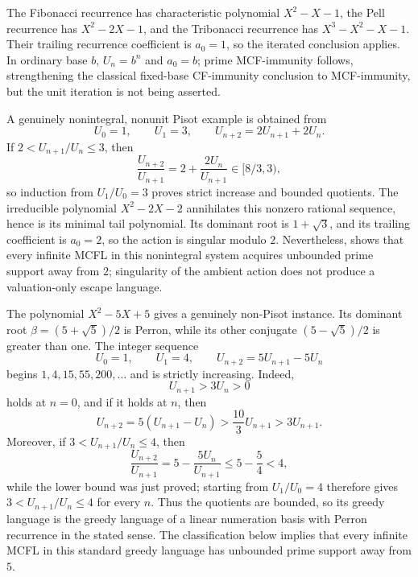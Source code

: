 \begin{example}
  \label{ex:pisot-unit-nonunit}
  The Fibonacci recurrence has characteristic polynomial
  \(X^2-X-1\), the Pell recurrence has \(X^2-2X-1\), and the
  Tribonacci recurrence has \(X^3-X^2-X-1\). Their trailing recurrence
  coefficient is \(a_0=1\), so the iterated conclusion applies. In
  ordinary base \(b\), \(U_n=b^n\) and \(a_0=b\); prime MCF-immunity
  follows, strengthening the classical fixed-base CF-immunity conclusion
  to MCF-immunity, but the unit iteration is not being asserted.

  A genuinely nonintegral, nonunit Pisot example is obtained from
  \[
    U_0=1,\qquad U_1=3,\qquad
    U_{n+2}=2U_{n+1}+2U_n.
  \]
  If \(2<U_{n+1}/U_n\le3\), then
  \[
    \frac{U_{n+2}}{U_{n+1}}
      =2+\frac{2U_n}{U_{n+1}}\in[8/3,3),
  \]
  so induction from \(U_1/U_0=3\) proves strict increase and bounded
  quotients. The irreducible polynomial \(X^2-2X-2\) annihilates this
  nonzero rational sequence, hence is its minimal tail polynomial. Its
  dominant root is \(1+\sqrt3\), and its trailing coefficient is
  \(a_0=2\), so the action is singular modulo \(2\). Nevertheless,
   shows that every
  infinite MCFL in this nonintegral system acquires unbounded prime support
  away from \(2\); singularity of the ambient action does not produce a
  valuation-only escape language.

  The polynomial \(X^2-5X+5\) gives a genuinely non-Pisot instance. Its
  dominant root \(\beta=(5+\sqrt5)/2\) is Perron, while its other conjugate
  \((5-\sqrt5)/2\) is greater than one. The integer sequence
  \[
    U_0=1,\qquad U_1=4,\qquad
    U_{n+2}=5U_{n+1}-5U_n
  \]
  begins \(1,4,15,55,200,\ldots\) and is strictly increasing. Indeed,
  \[
    U_{n+1}>3U_n>0
  \]
  holds at \(n=0\), and if it holds at \(n\), then
  \[
    U_{n+2}=5(U_{n+1}-U_n)
      >\frac{10}{3}U_{n+1}>3U_{n+1}.
  \]
  Moreover, if \(3<U_{n+1}/U_n\le4\), then
  \[
    \frac{U_{n+2}}{U_{n+1}}
      =5-\frac{5U_n}{U_{n+1}}
      \le 5-\frac54<4,
  \]
  while the lower bound was just proved; starting from \(U_1/U_0=4\)
  therefore gives \(3<U_{n+1}/U_n\le4\) for every \(n\). Thus the quotients
  are bounded, so its greedy language is the greedy language of a linear
  numeration basis with Perron recurrence in the stated sense. The
  classification below implies that every infinite MCFL in this standard
  greedy language has unbounded prime support away from \(5\).
\end{example}

